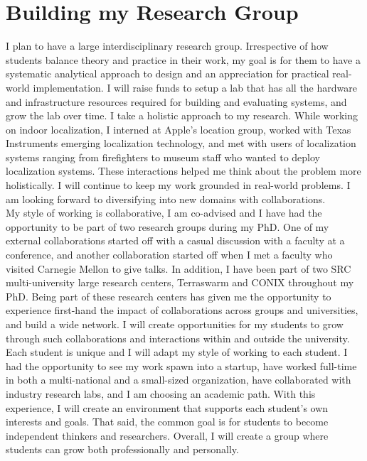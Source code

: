 \documentclass[10pt]{article}
\begin{document}
\section{Building my Research Group}
I plan to have a large interdisciplinary research group. Irrespective of how students balance theory and practice in their work, my goal is for them to have a systematic analytical approach to design and an appreciation for practical real-world implementation. I will raise funds to setup a lab that has all the hardware and infrastructure resources required for building and evaluating systems, and grow the lab over time. I take a holistic approach to my research. While working on indoor localization, I interned at Apple's location group, worked with Texas Instruments emerging localization technology, and met with users of localization systems ranging from firefighters to museum staff who wanted to deploy localization systems. These interactions helped me think about the problem more holistically.  I will continue to keep my work grounded in real-world problems. I am looking forward to diversifying into new domains with collaborations.  \\

My style of working is collaborative, I am co-advised and I have had the opportunity to be part of two research groups during my PhD. One of my external collaborations started off with a casual discussion with a faculty at a conference, and another collaboration started off when I met a faculty who visited Carnegie Mellon to give talks. %
In addition, I have been part of two SRC multi-university large research centers, Terraswarm and CONIX throughout my PhD. Being part of these research centers has given me the opportunity to experience first-hand the impact of collaborations across groups and universities, and build a wide network. I will create opportunities for my students to grow through such collaborations and interactions within and outside the university.  \\

Each student is unique and I will adapt my style of working to each student.  %
I had the opportunity to see my work spawn into a startup, have worked full-time in both a multi-national and a small-sized organization, have collaborated with industry research labs, and I am choosing an academic path. With this experience, I will create an environment that supports each student's own interests and goals. That said, the common goal is for students to become independent thinkers and researchers. %
 Overall, I will create a group where students can grow both professionally and personally.\\
\end{document}
